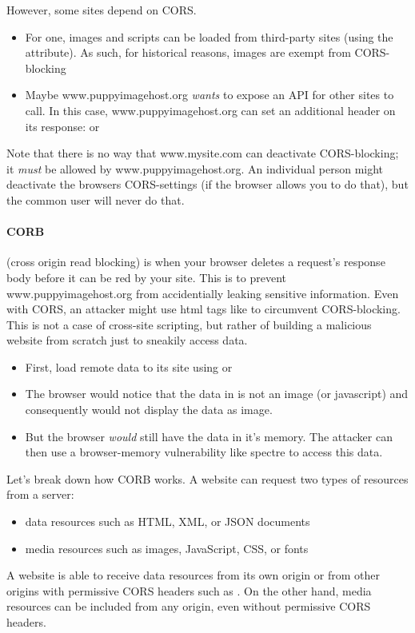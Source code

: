 However, some sites depend on CORS.
\begin{itemize}
	\item For one, images and scripts can be loaded from third-party sites (using the  attribute). As such, for historical reasons, images are exempt from CORS-blocking
	\item Maybe www.puppyimagehost.org \emph{wants} to expose an API for other sites to call. In this case, www.puppyimagehost.org can set an additional header on its response:  or 
\end{itemize}
Note that there is no way that www.mysite.com can deactivate CORS-blocking; it \emph{must} be allowed by www.puppyimagehost.org. An individual person might deactivate the browsers CORS-settings (if the browser allows you to do that), but the common user will never do that. 

\paragraph{CORB} (cross origin read blocking) is when your browser deletes a request's response body before it can be red by your site. This is to prevent www.puppyimagehost.org from accidentially leaking sensitive information.
Even with CORS, an attacker might use html tags like  to circumvent CORS-blocking. This is not a case of cross-site scripting, but rather of building a malicious website from scratch just to sneakily access data.
\begin{itemize}
	\item First, load remote data to its site using  or 
	\item The browser would notice that the data in  is not an image (or javascript) and consequently would not display the data as image. 
	\item But the browser \emph{would} still have the data in it's memory. The attacker can then use a browser-memory vulnerability like spectre to access this data. 
\end{itemize}

Let’s break down how CORB works. A website can request two types of resources from a server:
\begin{itemize}
	\item data resources such as HTML, XML, or JSON documents
	\item media resources such as images, JavaScript, CSS, or fonts
\end{itemize}
A website is able to receive data resources from its own origin or from other origins with permissive CORS headers such as . On the other hand, media resources can be included from any origin, even without permissive CORS headers.

